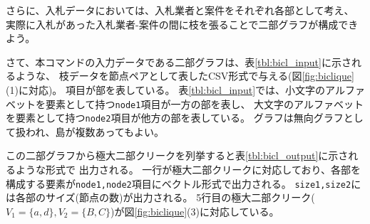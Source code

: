 さらに、入札データにおいては、入札業者と案件をそれぞれ各部として考え、
実際に入札があった入札業者-案件の間に枝を張ることで二部グラフが構成できよう。

さて、本コマンドの入力データである二部グラフは、表\ref{tbl:bicl_input}に示されるような、
枝データを節点ペアとして表したCSV形式で与える(図\ref{fig:biclique} (1)に対応)。
項目が部を表している。
表\ref{tbl:bicl_input}では、小文字のアルファベットを要素として持つ\verb|node1|項目が一方の部を表し、
大文字のアルファベットを要素として持つ\verb|node2|項目が他方の部を表している。
グラフは無向グラフとして扱われ、島が複数あってもよい。

この二部グラフから極大二部クリークを列挙すると表\ref{tbl:bicl_output}に示されるような形式で
出力される。
一行が極大二部クリークに対応しており、各部を構成する要素が\verb|node1,node2|項目にベクトル形式で出力される。
\verb|size1,size2|には各部のサイズ(節点の数)が出力される。
5行目の極大二部クリーク($V_1=\{a,d\},V_2=\{B,C\}$)が図\ref{fig:biclique}(3)に対応している。

